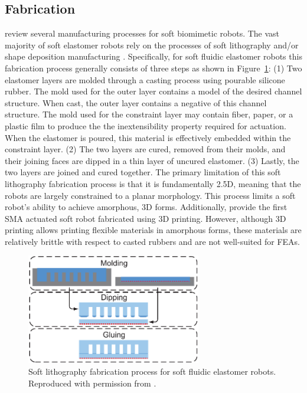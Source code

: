 \subsection{Fabrication}
\label{subsec:RW Fabrication}
\citet{cho2009review} review several manufacturing processes for soft biomimetic robots.
The vast majority of soft elastomer robots rely on the processes of soft lithography \citep{xia1998soft} and/or shape deposition manufacturing \citep{cham2002fast}.
Specifically, for soft fluidic elastomer robots this fabrication process generally consists of three steps as shown in Figure~\ref{fig:RW fabrication}: (1) Two elastomer layers are molded through a casting process using pourable silicone rubber. The mold used for the outer layer contains a model of the desired channel structure. When cast, the outer layer contains a negative of this channel structure. The mold used for the constraint layer may contain fiber, paper, or a plastic film to produce the the inextensibility property required for actuation. When the elastomer is poured, this material is effectively embedded within the constraint layer.
(2) The two layers are cured, removed from their molds, and their joining faces are dipped in a thin layer of uncured elastomer.
(3) Lastly, the two layers are joined and cured together.
The primary limitation of this soft lithography fabrication process is that it is fundamentally 2.5D, meaning that the robots are largely constrained to a planar morphology.
This process limits a soft robot's ability to achieve amorphous, 3D forms.
Additionally, \citet{umedachi2013highly} provide the first SMA actuated soft robot fabricated using 3D printing.
However, although 3D printing allows printing flexible materials in amorphous forms, these materials are relatively brittle with respect to casted rubbers and are not well-suited for FEAs.
\begin{figure}
  \centering
  \includegraphics[width=3in]{figures/relatedwork/fabrication.eps}
  \caption[Soft lithography fabrication process.]{Soft lithography fabrication process for soft fluidic elastomer robots. Reproduced with permission from \citet{onal2012modular}.}\label{fig:RW fabrication}
\end{figure} 

